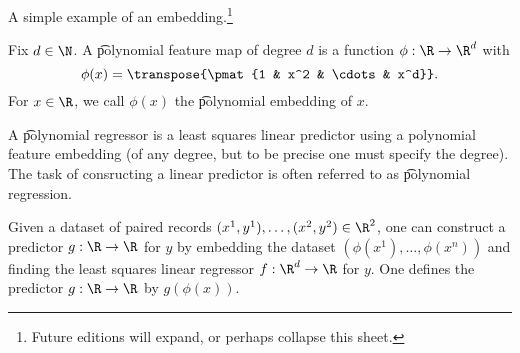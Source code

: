 

A simple example of an embedding.\footnote{Future editions will expand, or perhaps collapse this sheet.}


Fix $d \in \N$.
A \t{polynomial feature map} of degree $d$ is a function $\phi: \R \to \R^d$ with
\[
  \phi(x) = \transpose{\pmat{1 & x^2 & \cdots & x^d}}.
\]
For $x \in \R$, we call $\phi(x)$ the \t{polynomial embedding} of $x$.

A \t{polynomial regressor} is a least squares linear predictor using a polynomial feature embedding (of any degree, but to be precise one must specify the degree).
The task of consructing a linear predictor is often referred to as \t{polynomial regression}.

Given a dataset of paired records $(x^1, y^1), \dots, (x^2, y^2) \in \R^2$, one can construct a predictor $g: \R \to \R$ for $y$ by embedding the dataset $(\phi(x^1), \dots, \phi(x^n))$ and finding the least squares linear regressor $f: \R^d \to \R$ for $y$.
One defines the predictor $g: \R \to \R$ by $g(\phi(x))$.


\blankpage
